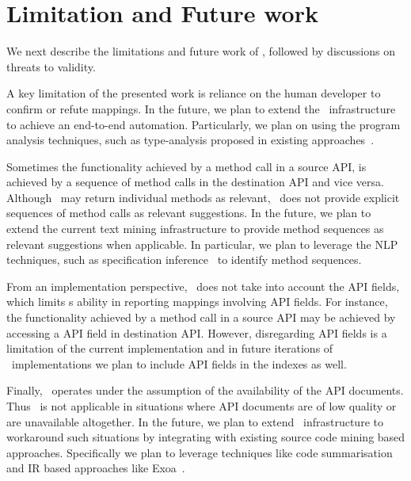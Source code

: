 \section{Limitation and Future work}
\label{sec:discussion}

We next describe the limitations and future work of \tool,
followed by discussions on threats to validity. 

A key limitation of the presented work is reliance on the human developer
to confirm or refute mappings.
In the future, we plan to extend the \tool\ infrastructure to achieve an end-to-end automation. 
Particularly, we plan on using the program analysis techniques, 
such as type-analysis proposed in
existing approaches~\cite{nguyen2014statistical,zhong09SE}.



Sometimes the functionality achieved by a method call in a source API,
is achieved by a sequence of method calls in the destination API and vice versa.
Although \tool\ may return individual methods as relevant, 
\tool\ does not provide explicit sequences of method calls as relevant suggestions.
In the future, we plan to extend the current text mining infrastructure
to provide method sequences as relevant suggestions when applicable. 
In particular, we plan to leverage the NLP techniques, such as
specification inference~\cite{pandita12:inferring} to identify method sequences. 



From an implementation perspective, \tool\ does not take into account 
the API fields,
which limits \tool s ability in reporting mappings involving API fields.
For instance, the functionality achieved by a method call in a source API
may be achieved by accessing a API field in destination API.
However, disregarding API fields is a limitation of the current implementation 
and in future iterations of \tool\ implementations we plan to include API fields in the indexes as well.

Finally, \tool\ operates under the assumption of the availability of the API documents.
Thus \tool\ is not applicable in situations where API documents are of low quality or are unavailable altogether.
In the future, we plan to extend \tool\ infrastructure to workaround such situations
by integrating with existing source code mining based approaches.
Specifically we plan to leverage techniques like code summarisation~\cite{sridhara2011ICPC} and IR based approaches like Exoa~\cite{kim2010towards}.


